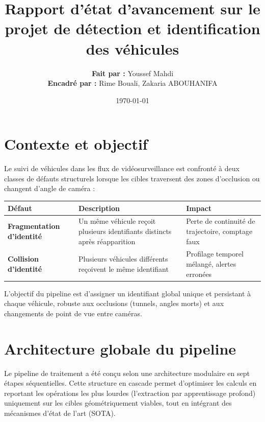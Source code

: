 \documentclass[12pt, a4paper]{article}
\title{\textbf{Rapport d'état d'avancement sur le projet de détection et identification des véhicules}}
\author{\textbf{Fait par :} Youssef Mahdi \\ \textbf{Encadré par :} Rime Bouali, Zakaria ABOUHANIFA}
\date{\today}
\begin{document}
\maketitle

\section{Contexte et objectif}

Le suivi de véhicules dans les flux de vidéosurveillance est confronté à deux classes de défauts structurels lorsque les cibles traversent des zones d'occlusion ou changent d'angle de caméra :

\vspace{0.5cm}
\begin{table}[h]
    \centering
    \renewcommand{\arraystretch}{1.5}
    \begin{tabularx}{\textwidth}{|>{\bfseries}l|X|X|}
    \hline
    \textbf{Défaut} & \textbf{Description} & \textbf{Impact} \\
    \hline
    Fragmentation d'identité & Un même véhicule reçoit plusieurs identifiants distincts après réapparition & Perte de continuité de trajectoire, comptage faux \\
    \hline
    Collision d'identité & Plusieurs véhicules différents reçoivent le même identifiant & Profilage temporel mélangé, alertes erronées \\
    \hline
    \end{tabularx}
\end{table}
\vspace{0.5cm}

L'objectif du pipeline est d'assigner un identifiant global unique et persistant à chaque véhicule, robuste aux occlusions (tunnels, angles morts) et aux changements de point de vue entre caméras.

\section{Architecture globale du pipeline}

Le pipeline de traitement a été conçu selon une architecture modulaire en sept étapes séquentielles. Cette structure en cascade permet d'optimiser les calculs en reportant les opérations les plus lourdes (l'extraction par apprentissage profond) uniquement sur les cibles géométriquement viables, tout en intégrant des mécanismes d'état de l'art (SOTA).
\end{document}
